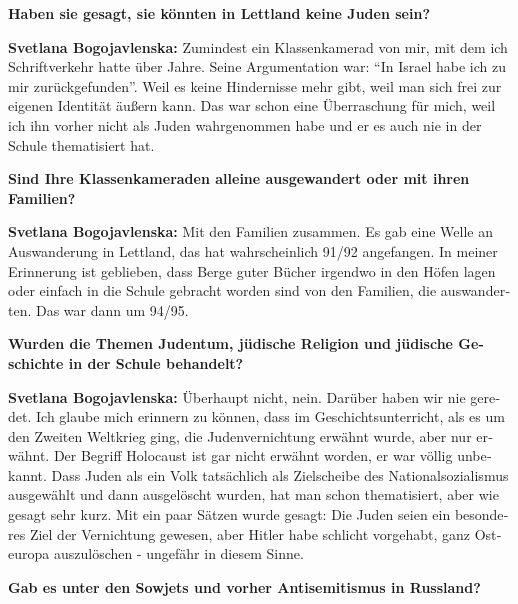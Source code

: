 \begin{otherlanguage}{ngerman}
\textbf{Haben sie gesagt, sie könnten in Lettland keine Juden sein?}

\textbf{Svetlana Bogojavlenska:} Zumindest ein Klassenkamerad von mir, mit dem ich Schriftverkehr hatte über Jahre. Seine Argumentation war: "`In Israel habe ich zu mir zurückgefunden"'. Weil es keine Hindernisse mehr gibt, weil man sich frei zur eigenen Identität äußern kann. Das war schon eine Überraschung für mich, weil ich ihn vorher nicht als Juden wahrgenommen habe und er es auch nie in der Schule thematisiert hat.

\textbf{Sind Ihre Klassenkameraden alleine ausgewandert oder mit ihren Familien?}

\textbf{Svetlana Bogojavlenska:} Mit den Familien zusammen. Es gab eine Welle an Auswanderung in Lettland, das hat wahrscheinlich 91/92 angefangen. In meiner Erinnerung ist geblieben, dass Berge guter Bücher irgendwo in den Höfen lagen oder einfach in die Schule gebracht worden sind von den Familien, die auswanderten. Das war dann um 94/95.

\textbf{Wurden die Themen Judentum, jüdische Religion und jüdische Geschichte in der Schule behandelt?}

\textbf{Svetlana Bogojavlenska:} Überhaupt nicht, nein. Darüber haben wir nie geredet. Ich glaube mich erinnern zu können, dass im Geschichtsunterricht, als es um den Zweiten Weltkrieg ging, die Judenvernichtung erwähnt wurde, aber nur erwähnt. Der Begriff Holocaust ist gar nicht erwähnt worden, er war völlig unbekannt. Dass Juden als ein Volk tatsächlich als Zielscheibe des Nationalsozialismus ausgewählt und dann ausgelöscht wurden, hat man schon thematisiert, aber wie gesagt sehr kurz. Mit ein paar Sätzen wurde gesagt: Die Juden seien ein besonderes Ziel der Vernichtung gewesen, aber Hitler habe schlicht vorgehabt, ganz Osteuropa auszulöschen - ungefähr in diesem Sinne.

\textbf{Gab es unter den Sowjets und vorher Antisemitismus in Russland?}


\end{otherlanguage}
